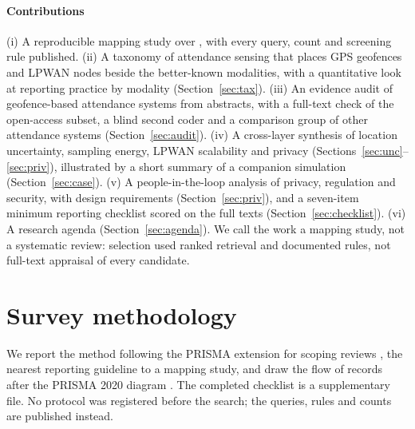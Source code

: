 \documentclass[preprint,12pt]{elsarticle}
\begin{document}
\paragraph{Contributions} (i) A reproducible mapping study over \srcPhrase{}, with every query, count and screening rule published. (ii) A taxonomy of attendance sensing that places GPS geofences and LPWAN nodes beside the better-known modalities, with a quantitative look at reporting practice by modality (Section~\ref{sec:tax}). (iii) An evidence audit of \nAudit{} geofence-based attendance systems from abstracts, with a full-text check of the open-access subset, a blind second coder and a comparison group of \nOthersRecent{} other attendance systems (Section~\ref{sec:audit}). (iv) A cross-layer synthesis of location uncertainty, sampling energy, LPWAN scalability and privacy (Sections~\ref{sec:unc}--\ref{sec:priv}), illustrated by a short summary of a companion simulation (Section~\ref{sec:case}). (v) A people-in-the-loop analysis of privacy, regulation and security, with design requirements (Section~\ref{sec:priv}), and a seven-item minimum reporting checklist scored on the full texts (Section~\ref{sec:checklist}). (vi) A research agenda (Section~\ref{sec:agenda}). We call the work a mapping study, not a systematic review: selection used ranked retrieval and documented rules, not full-text appraisal of every candidate.



\section{Survey methodology}\label{sec:method}
We report the method following the PRISMA extension for scoping reviews \cite{tricco2018prismascr}, the nearest reporting guideline to a mapping study, and draw the flow of records after the PRISMA 2020 diagram \cite{page2021prisma}. The completed checklist is a supplementary file. No protocol was registered before the search; the queries, rules and counts are published instead.
\end{document}
